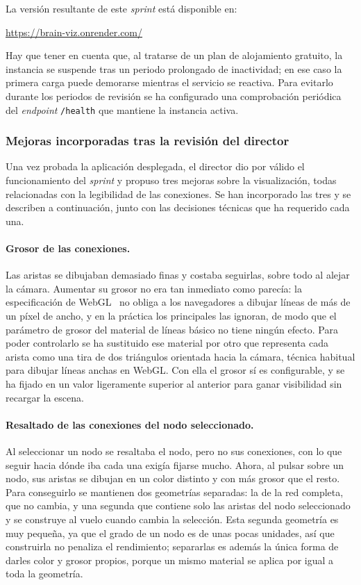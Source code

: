 La versión resultante de este \textit{sprint} está disponible en:

\begin{center}
	\url{https://brain-viz.onrender.com/}
\end{center}

Hay que tener en cuenta que, al tratarse de un plan de alojamiento gratuito, la instancia se suspende tras
un periodo prolongado de inactividad; en ese caso la primera carga puede demorarse mientras el
servicio se reactiva. Para evitarlo durante los periodos de revisión se ha configurado una
comprobación periódica del \textit{endpoint} \texttt{/health} que mantiene la instancia activa.

\subsubsection*{Mejoras incorporadas tras la revisión del director}

Una vez probada la aplicación desplegada, el director dio por válido el funcionamiento del
\textit{sprint} y propuso tres mejoras sobre la visualización, todas relacionadas con la legibilidad
de las conexiones. Se han incorporado las tres y se describen a continuación, junto con las
decisiones técnicas que ha requerido cada una.

\paragraph*{Grosor de las conexiones.} Las aristas se dibujaban demasiado finas y costaba seguirlas,
sobre todo al alejar la cámara. Aumentar su grosor no era tan inmediato como parecía: la
especificación de WebGL~\cite{webgl} no obliga a los navegadores a dibujar líneas de más de un
píxel de ancho, y
en la práctica los principales las ignoran, de modo que el parámetro de grosor del material de
líneas básico no tiene ningún efecto. Para poder controlarlo se ha sustituido ese material por otro
que representa cada arista como una tira de dos triángulos orientada hacia la cámara, técnica
habitual para dibujar líneas anchas en WebGL. Con ella el grosor sí es configurable, y se ha fijado
en un valor ligeramente superior al anterior para ganar visibilidad sin recargar la escena.

\paragraph*{Resaltado de las conexiones del nodo seleccionado.} Al seleccionar un nodo se resaltaba
el nodo, pero no sus conexiones, con lo que seguir hacia dónde iba cada una exigía fijarse mucho.
Ahora, al pulsar sobre un nodo, sus aristas se dibujan en un color distinto y con más grosor que el
resto. Para conseguirlo se mantienen dos geometrías separadas: la de la red completa, que no cambia,
y una segunda que contiene solo las aristas del nodo seleccionado y se construye al vuelo cuando
cambia la selección. Esta segunda geometría es muy pequeña, ya que el grado de un nodo es de unas
pocas unidades, así que construirla no penaliza el rendimiento; separarlas es además la única forma
de darles color y grosor propios, porque un mismo material se aplica por igual a toda la geometría.

